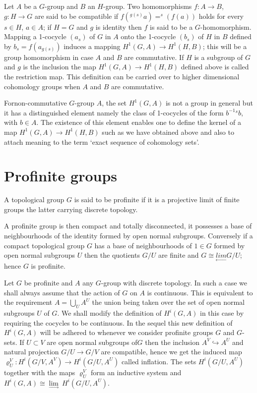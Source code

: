 Let $A$ be a $G$-group and $B$ an $H$-group. Two homomorphisms $f: A
\rightarrow B$, $g: H \rightarrow G$ are said to be compatible if
$f(^{g{(s)}}a) = ^s(f(a))$ holds for every $s \in H$, $a \in A$; if $H =
G$ and $g$ is identity then $f$ is said to be a
$G$-homomorphism. Mapping a 1-cocycle $(a_s)$ of $G$ in $A$ onto the
1-cocycle $(b_s)$ of $H$ in $B$ defined by $b_s = f(a_{g(s)})$
induces a mapping $H^1(G,A) \rightarrow H^1(H,B)$; this will be a
group homomorphism in case $A$ and $B$ are commutative. If $H$ is a
subgroup of $G$ and $g$ is the inclusion the map $H^1(G,A) \rightarrow
H^1(H,B)$ defined above is called the restriction map. This definition
can be carried over to higher dimensional cohomology groups when $A$ and
$B$ are commutative. 

For\pageoriginale non-commutative $G$-group $A$, the set $H^1(G,A)$ is
not a group 
in general but it has a distinguished element namely the class of
1-cocycles of the form $b^{-1}{}^sb$, with $b \in A$. The existence of
this element enables one to define the kernel of a map $H^1(G,A)
\rightarrow H^1(H,B)$ such as we have obtained above and also to
attach meaning to the term `exact sequence of cohomology sets'. 


\section{Profinite groups}\label{chap1:sec1.2}


\begin{defi*}
A topological group $G$ is said to be profinite if it is a projective
limit of finite groups the latter carrying discrete topology. 
\end{defi*}

A profinite group is then compact and totally disconnected, it
possesses a base of neighbourhoods of the identity formed by open
normal subgroups. Conversely if a compact topological group $G$ has a
base of neighbourhoods of $1\in G$ formed by open normal subgroups $U$
then the quotients $G/U$ are finite and
$G\cong\underset{\leftarrow}{lim}G/U$; hence $G$ is profinite. 

Let $G$ be profinite and $A$ any $G$-group with discrete topology. In
such a case we shall always assume that the action of $G$ on $A$ is
continuous. This is equivalent to the requirement $A =
\bigcup\limits_U A^U$ the union being taken over the set of open
normal subgroups $U$ of $G$. We shall modify the definition of
$H^i(G,A)$ in this case by requiring the cocycles to be continuous. In
the sequel this new definition of $H^i(G,A)$ will be adhered to
whenever we consider profinite groups $G$ and $G$-sets. If $U \subset
V$ are open normal subgroups of\pageoriginale $G$ then the inclusion $A^V
\hookrightarrow A^U$  and natural projection $G/U \rightarrow G/V$ are
compatible, hence we get the induced map $\varrho^V_U : H^i(G/V,A^V)
\rightarrow H^i(G/U,A^U)$ called inflation. The sets $H^i(G/U,A^U)$
together with the maps $\varrho^V_U$ form an inductive system and
$H^i(G,A) \cong \underset{\rightarrow}{\lim}~ H^i(G/U,A^U)$. 


